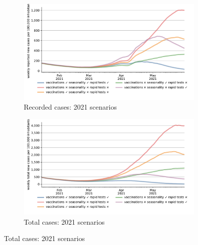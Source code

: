 \begin{figure}[!tp]
    \centering
    
    \begin{subfigure}[b]{0.475\textwidth}
        \centering
        \includegraphics[width=\textwidth]{../figures/results/figures/scenario_comparisons/effect_of_channels_on_pessimistic_scenario/full_new_known_case}
        \caption{{\small Recorded cases: 2021 scenarios}}
        \label{fig:2021_scenarios_recorded}
    \end{subfigure}
    \hfill
    \begin{subfigure}[b]{0.475\textwidth}
        \centering
        \includegraphics[width=\textwidth]{../figures/results/figures/scenario_comparisons/effect_of_channels_on_pessimistic_scenario/full_newly_infected}
        \caption{{\small Total cases: 2021 scenarios}}
        \label{fig:2021_scenarios_newly_infected}
    \end{subfigure}
    

\end{figure}
